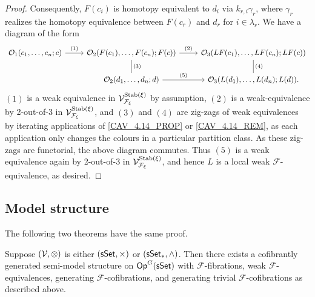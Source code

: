 \documentclass[a4paper,10pt
,draft
]{article}%
\renewcommand{\F}{\mathcal F}
\renewcommand{\1}{\ensuremath{\mathbb{id}}}
\begin{document}
\begin{proof}
      Consequently, $F(c_i)$ is homotopy equivalent to $d_i$ via $k_{r,i}\gamma_r$,
      where $\gamma_r$ realizes the homotopy equivalence between $F(c_r)$ and $d_r$ for $i \in \lambda_r$.
      We have a diagram of the form
      \begin{equation}
            \label{TWOOFTHREE_EQ}
            \begin{tikzcd}
                  \O_1(c_1,\ldots, c_n;c) \arrow[r, "(1)"]
                  &
                  \O_2(F(c_1),\ldots, F(c_n); F(c)) \arrow[d,dash, "(3)"] \arrow[r, "(2)"]
                  &
                  \O_3(LF(c_1),\ldots, LF(c_n);LF(c)) \arrow[d, dash, "(4)"]
                  \\
                  &
                  \O_2(d_1,\ldots, d_n;d) \arrow[r, "(5)"]
                  &
                  \O_3(L(d_1),\ldots, L(d_n); L(d)).
            \end{tikzcd}
      \end{equation}
      $(1)$ is a weak equivalence in $\V^{\Stab(\xi)}_{\F_\xi}$ by assumption,
      $(2)$ is a weak-equivalence by 2-out-of-3 in $\V^{\Stab(\xi)}_{\F_\xi}$, and
      $(3)$ and $(4)$ are zig-zags of weak equivalences by iterating applications of \ref{CAV_4.14_PROP} or \ref{CAV_4.14_REM},
      as each application only changes the colours in a particular partition class.
      As these zig-zags are functorial, the above diagram commutes.
      Thus $(5)$ is a weak equivalence again by 2-out-of-3 in $\V^{\Stab(\xi)}_{\F_\xi}$, and hence
      $L$ is a local weak $\F$-equivalence, as desired.
\end{proof}


\subsection{Model structure}

The following two theorems have the same proof.

\begin{theorem}
      \label{SSET_MODEL_THM}
      Suppose $(\mathcal V, \otimes)$ is either $(\mathsf{sSet}, \times)$ or $(\sSet_{\**}, \wedge)$.
      Then there exists a cofibrantly generated semi-model structure on $\mathsf{Op}^G(\mathsf{sSet})$ with
      $\F$-fibrations, weak $\F$-equivalences, generating $\F$-cofibrations, and generating trivial $\F$-cofibrations as described above.
\end{theorem}
\end{document}
